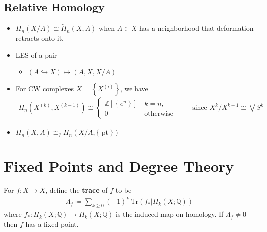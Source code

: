 
\hypertarget{relative-homology}{%
\subsection{Relative Homology}\label{relative-homology}}

\begin{fact}

\envlist

\begin{itemize}
\item
  \(H_{n}(X/A) \cong \tilde H_{n}(X, A)\) when \(A\subset X\) has a
  neighborhood that deformation retracts onto it.
\item
  LES of a pair

  \begin{itemize}
  \tightlist
  \item
    \((A \hookrightarrow X) \mapsto (A, X, X/A)\)
  \end{itemize}
\item
  For CW complexes \(X = \left\{{X^{(i)}}\right\}\), we have
  \begin{align*}
  H_{n}(X^{(k)},X^{(k-1)}) \cong \begin{cases}{\mathbb{Z}}[\left\{{e^n}\right\}]~ &k=n,\\ 0 &\text{otherwise}\end{cases} \qquad\text{ since } X^k/X^{k-1} \cong \bigvee S^k
  \end{align*}
\item
  \(H_{n}(X, A) \cong_? H_{n}(X/A, {\{\operatorname{pt}\}})\)
\end{itemize}

\end{fact}

\hypertarget{fixed-points-and-degree-theory}{%
\section{Fixed Points and Degree
Theory}\label{fixed-points-and-degree-theory}}

\begin{theorem}

For \(f:X\to X\), define the \textbf{trace} of \(f\) to be
\begin{align*}
\Lambda_f \coloneqq\sum_{k \geq 0} (-1)^k ~\mathrm{Tr}(f_* \mathrel{\Big|}H_k(X; {\mathbb{Q}}))
\end{align*}
where \(f_*: H_k(X; {\mathbb{Q}}) \to H_k(X; {\mathbb{Q}})\) is the
induced map on homology. If \(\Lambda_f \neq 0\) then \(f\) has a fixed
point.

\end{theorem}

